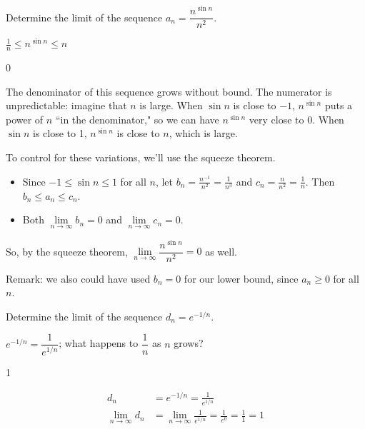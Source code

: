 \begin{Mquestion}
Determine the limit of the sequence
$a_n = \dfrac{n^{\sin n}}{n^2}$.
\end{Mquestion}
\begin{hint}
$\displaystyle\frac{1}{n}\leq n^{\sin n}\leq n$
\end{hint}
\begin{answer}
0
\end{answer}
\begin{solution}
The denominator of this sequence grows without bound. The numerator is unpredictable: imagine that $n$ is large. When $\sin n$ is close to $-1$, $n^{\sin n}$ puts a power of $n$ ``in the denominator," so we can have $n^{\sin n}$ very close to 0. When $\sin n$ is close to 1, $n^{\sin n}$ is close to $n$, which is large.

To control for these variations, we'll use the squeeze theorem.
\begin{itemize}
\item Since $-1 \leq \sin n \leq 1$ for all $n$, let $b_n = \frac{n^{-1}}{n^2} = \frac{1}{n^3}$ and
$c_n = \frac{n}{n^2}=\frac{1}{n}$. Then $b_n \leq a_n \leq c_n$.
\item Both $\lim\limits_{n \to \infty}b_n=0$ and $\lim\limits_{n \to \infty}c_n=0$.
\end{itemize}
So, by the squeeze theorem,
$\lim\limits_{n \to \infty}\dfrac{n^{\sin n}}{n^2}=0$ as well.

Remark: we also could have used $b_n=0$ for our lower bound, since $a_n \geq 0$ for all $n$.
\end{solution}

\begin{Mquestion}
Determine the limit of the sequence
$d_n = e^{-1/n}$.
\end{Mquestion}
\begin{hint}
$e^{-1/n} = \dfrac{1}{e^{1/n}}$; what happens to $\dfrac{1}{n}$ as $n$ grows?
\end{hint}
\begin{answer}
1
\end{answer}
\begin{solution}
\begin{align*}
d_n&=e^{-1/n}=\frac{1}{e^{1/n}}\\
\lim_{n \to \infty }d_n&=\lim_{n \to \infty }\frac{1}{e^{1/n}} = \frac{1}{e^0}=\frac11=1
\end{align*}
\end{solution}

